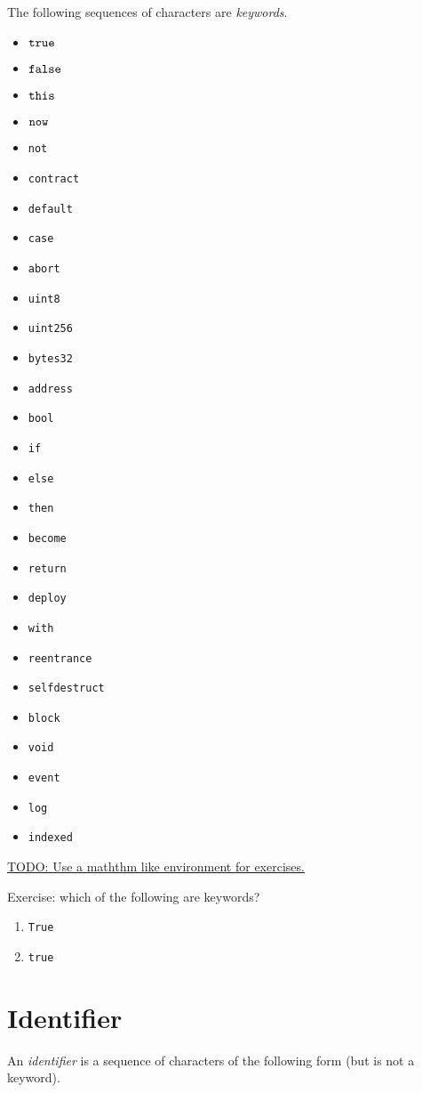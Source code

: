 \documentclass{book}
\newcommand{\todo}[1]{\underline{TODO: {#1}}}
\begin{document}
The following sequences of characters are \textit{keywords}.
\begin{itemize}
\item $\text{\texttt{true}}$
\item $\text{\texttt{false}}$
\item $\text{\texttt{this}}$
\item $\text{\texttt{now}}$
\item \texttt{not}
\item \texttt{contract}
\item \texttt{default}
\item \texttt{case}
\item \texttt{abort}
\item \texttt{uint8}
\item \texttt{uint256}
\item \texttt{bytes32}
\item \texttt{address}
\item \texttt{bool}
\item \texttt{if}
\item \texttt{else}
\item \texttt{then}
\item \texttt{become}
\item \texttt{return}
\item \texttt{deploy}
\item \texttt{with}
\item \texttt{reentrance}
\item \texttt{selfdestruct}
\item \texttt{block}
\item \texttt{void}
\item \texttt{event}
\item \texttt{log}
\item \texttt{indexed}
\end{itemize}

\todo{Use a maththm like environment for exercises.}

Exercise: which of the following are keywords?
\begin{enumerate}
\item \texttt{True}
\item \texttt{true}
\end{enumerate}

\section{Identifier}

An \textit{identifier} is a sequence of characters of the following form (but is not a keyword).
\end{document}
